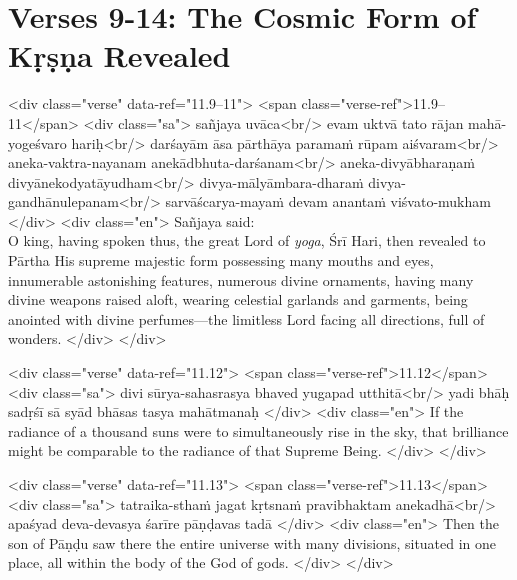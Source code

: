 \newpage
\section{Verses 9-14: The Cosmic Form of Kṛṣṇa Revealed}\label{sec-verses-9-14-the-cosmic-form-of-krsna-revealed}


\begin{html}
<div class="verse" data-ref="11.9–11">
  <span class="verse-ref">11.9–11</span>
  <div class="sa">
    sañjaya uvāca<br/>
    evam uktvā tato rājan mahā-yogeśvaro hariḥ<br/>
    darśayām āsa pārthāya paramaṁ rūpam aiśvaram<br/>
    aneka-vaktra-nayanam anekādbhuta-darśanam<br/>
    aneka-divyābharaṇaṁ divyānekodyatāyudham<br/>
    divya-mālyāmbara-dharaṁ divya-gandhānulepanam<br/>
    sarvāścarya-mayaṁ devam anantaṁ viśvato-mukham
  </div>
  <div class="en">
    \hspace*{1em}Sañjaya said: \\ O king, having spoken thus, the great Lord of \textit{yoga}, Śrī Hari, then revealed to Pārtha His supreme majestic form possessing many mouths and eyes, innumerable astonishing features, numerous divine ornaments, having many divine weapons raised aloft, wearing celestial garlands and garments, being anointed with divine perfumes---the limitless Lord facing all directions, full of wonders.
  </div>
</div>
\end{html}



\begin{html}
<div class="verse" data-ref="11.12">
  <span class="verse-ref">11.12</span>
  <div class="sa">
    divi sūrya-sahasrasya bhaved yugapad utthitā<br/>
    yadi bhāḥ sadṛśī sā syād bhāsas tasya mahātmanaḥ
  </div>
  <div class="en">
    If the radiance of a thousand suns were to simultaneously rise in the sky, that brilliance might be comparable to the radiance of that Supreme Being.
  </div>
</div>
\end{html}



\begin{html}
<div class="verse" data-ref="11.13">
  <span class="verse-ref">11.13</span>
  <div class="sa">
    tatraika-sthaṁ jagat kṛtsnaṁ pravibhaktam anekadhā<br/>
    apaśyad deva-devasya śarīre pāṇḍavas tadā
  </div>
  <div class="en">
    Then the son of Pāṇḍu saw there the entire universe with many divisions, situated in one place, all within the body of the God of gods.
  </div>
</div>
\end{html}



